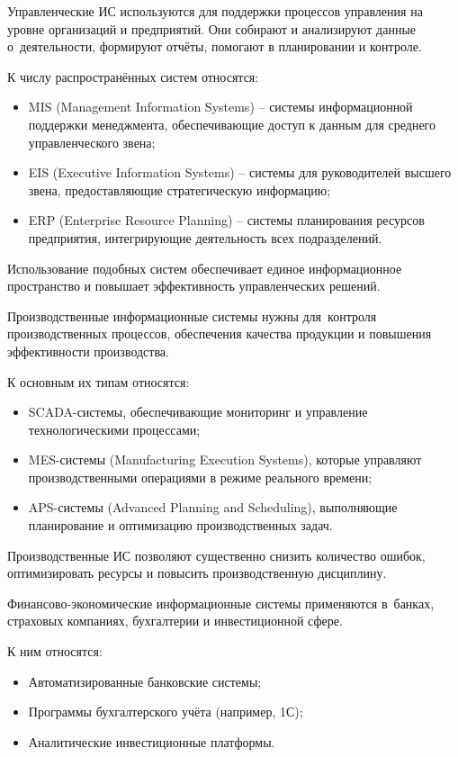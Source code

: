 \documentclass{ou}
\begin{document}
Управленческие ИС используются для поддержки процессов управления на уровне организаций и предприятий. Они собирают и анализируют данные о~деятельности, формируют отчёты, помогают в планировании и контроле.

К числу распространённых систем относятся:
\begin{itemize}[label=-, itemindent=4em, nosep]
\item MIS (Management Information Systems) -- системы информационной поддержки менеджмента, обеспечивающие доступ к данным для среднего управленческого звена;
\item EIS (Executive Information Systems) -- системы для руководителей высшего звена, предоставляющие стратегическую информацию;
\item ERP (Enterprise Resource Planning) -- системы планирования ресурсов предприятия, интегрирующие деятельность всех подразделений.
\end{itemize}

Использование подобных систем обеспечивает единое информационное пространство и повышает эффективность управленческих решений.

Производственные информационные системы нужны для~контроля производственных процессов, обеспечения качества продукции и повышения эффективности производства.

К основным их типам относятся:
\begin{itemize}[label=-, itemindent=4em, nosep]
\item SCADA-системы, обеспечивающие мониторинг и управление технологическими процессами;
\item MES-системы (Manufacturing Execution Systems), которые управляют производственными операциями в режиме реального времени;
\item APS-системы (Advanced Planning and Scheduling), выполняющие планирование и оптимизацию производственных задач.
\end{itemize}

Производственные ИС позволяют существенно снизить количество ошибок, оптимизировать ресурсы и повысить производственную дисциплину.

Финансово-экономические информационные системы применяются в~банках, страховых компаниях, бухгалтерии и инвестиционной сфере.

К ним относятся:
\begin{itemize}[label=-, itemindent=4em, nosep]
\item Автоматизированные банковские системы;
\item Программы бухгалтерского учёта (например, 1С);
\item Аналитические инвестиционные платформы.
\end{itemize}
\end{document}
